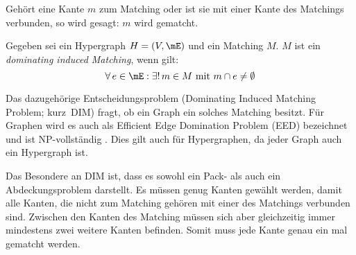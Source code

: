 Gehört eine Kante $m$ zum Matching oder ist sie mit einer Kante des Matchings verbunden, so wird gesagt: $m$ wird gematcht.

\begin{mydef}
Gegeben sei ein Hypergraph $H=(V,\mE)$ und ein Matching $M$. $M$ ist ein \emph{dominating induced Matching}, wenn gilt:
\[ \forall\,e \in \mE : \exists!\, m \in M \text{ mit } m\cap e \neq \emptyset \]
\end{mydef}



Das dazugehörige Entscheidungsproblem (Dominating Induced Matching Problem; kurz~DIM) fragt, ob ein Graph ein solches Matching besitzt. Für Graphen wird es auch als Efficient Edge Domination Problem (EED) bezeichnet und ist NP-vollständig \cite{dimNPv}. Dies gilt auch für Hypergraphen, da jeder Graph auch ein Hypergraph ist.

Das Besondere an DIM ist, dass es sowohl ein Pack- als auch ein Abdeckungsproblem darstellt. Es müssen genug Kanten gewählt werden, damit alle Kanten, die nicht zum Matching gehören mit einer des Matchings verbunden sind. Zwischen den Kanten des Matching müssen sich aber gleichzeitig immer mindestens zwei weitere Kanten befinden. Somit muss jede Kante genau ein mal gematcht werden.

